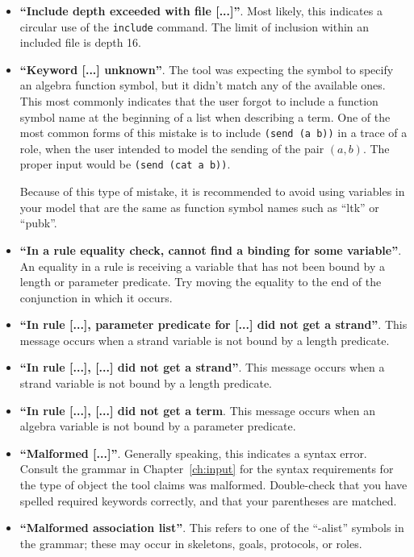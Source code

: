 \begin{itemize}
\item \textbf{``Include depth exceeded with file [...]''}.  Most
  likely, this indicates a circular use of the \texttt{include}
  command.  The limit of inclusion within an included file is depth
  16.

\item \textbf{``Keyword [...] unknown''}.  The tool was expecting the symbol
  to specify an algebra function symbol, but it didn't match any of the available
  ones.  This most commonly indicates that the user forgot to include a
  function symbol name at the beginning of a list when describing a term.  One of
  the most common forms of this mistake is to include \texttt{(send (a b))} in
  a trace of a role, when the user intended to model the sending of the pair $(a,b)$.
  The proper input would be \texttt{(send (cat a b))}.

  Because of this type of mistake, it is recommended to avoid using variables
  in your model that are the same as function symbol names such as
  ``ltk'' or ``pubk''.

\item \textbf{``In a rule equality check, cannot find a binding for
  some variable''}.  An equality in a rule is receiving a variable
  that has not been bound by a length or parameter predicate.  Try
  moving the equality to the end of the conjunction in which it
  occurs.

\item \textbf{``In rule [...], parameter predicate for [...] did not
  get a strand''}.  This message occurs when a strand variable is not
  bound by a length predicate.

\item \textbf{``In rule [...], [...] did not get a strand''}.
  This message occurs when a strand variable is not bound by a length
  predicate.

\item \textbf{``In rule [...], [...] did not get a term}.  This
  message occurs when an algebra variable is not bound by a parameter
  predicate.

\item \textbf{``Malformed [...]''}.  Generally speaking, this indicates
  a syntax error.  Consult the grammar in Chapter~\ref{ch:input} for the
  syntax requirements for the type of object the tool claims was malformed.
  Double-check that you have spelled required keywords correctly, and that
  your parentheses are matched.

\item \textbf{``Malformed association list''}.  This refers to one of
  the ``-alist'' symbols in the grammar; these may occur in skeletons,
  goals, protocols, or roles.


\end{itemize}
